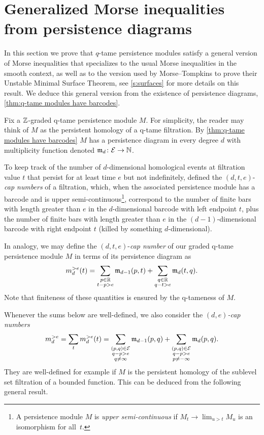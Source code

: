 
\section{Generalized Morse inequalities from persistence diagrams} \label{s:inequalities}

In this section we prove that $q$-tame persistence modules satisfy a general version of Morse inequalities that specializes to the usual Morse inequalities in the smooth context, as well as to the version used by Morse--Tompkins to prove their Unstable Minimal Surface Theorem, see \cref{s:surfaces} for more details on this result.
We deduce this general version from the existence of persistence diagrams, \cref{thm:q-tame modules have barcodes}.

Fix a $\mathbb{Z}$-graded q-tame persistence module $M$.
For simplicity, the reader may think of $M$ as the persistent homology of a q-tame filtration.
By \cref{thm:q-tame modules have barcodes} $M$ has a persistence diagram in every degree $d$ with multiplicity function denoted $\mathfrak{m}_d \colon \mathcal{E} \to \mathbb{N}$.

To keep track of the number of $d$-dimensional homological events at filtration value $t$ that persist for at least time $e$ but not indefinitely, \citet{Morse.1940} defined the $(d, t, e)$-\textit{cap numbers} of a filtration, which, when the associated persistence module has a barcode and is upper semi-continuous\footnote{A persistence module $M$ is \emph{upper semi-continuous} if $M_{t} \to \lim_{u > t} M_{u}$ is an isomorphism for all~$t$.}, correspond to the number of finite bars with length greater than $e$ in the $d$-dimensional barcode with left endpoint $t$, plus the number of finite bars with length greater than $e$ in the $(d-1)$-dimensional barcode with right endpoint $t$ (killed by something $d$-dimensional).

In analogy, we may define the $(d, t, e)$-\textit{cap number} of our graded q-tame persistence module $M$ in terms of its persistence diagram as
\[
m_{d}^{> e}(t) =
\sum_{\substack{p \in \mathbb{R} \\ t - p > e}} \mathfrak{m}_{d-1}(p, t) +
\sum_{\substack{q \in \mathbb{R} \\ q - t > e}} \mathfrak{m}_d(t, q).
\]
Note that finiteness of these quantities is ensured by the q-tameness of $M$.

Whenever the sums below are well-defined, we also consider the \emph{$(d,e)$-cap numbers} 
\[
m_{d}^{> e } 
= \sum_{t} m_{d}^{> e}(t) 
=
\sum_{\substack{(p,q) \in \mathcal{E} \\ q - p > e \\ q \neq \infty}} \mathfrak{m}_{d-1}(p,q)
+
\sum_{\substack{(p,q) \in \mathcal{E} \\ q - p > e \\ p \neq -\infty}}\mathfrak{m}_d(p,q).
\] 
They are well-defined for example if $M$ is the persistent homology of the sublevel set filtration of a bounded function. This can be deduced from the following general result.

